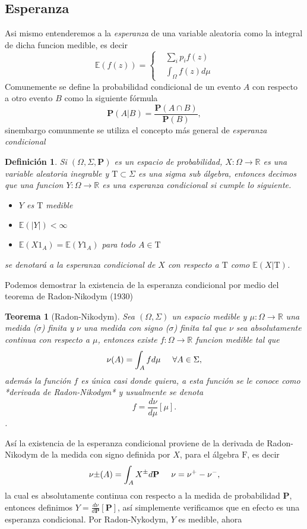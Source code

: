 \documentclass[letterpaper]{article}
\newtheorem{teorema}{Teorema}[section]
\newtheorem{def.}{Definici\'on}[section]
\newcommand{\prob}{\textbf{P}}
\newcommand{\esp}{\mathbb E}
\newcommand{\dem}{{\noindent \sc Demostraci\'on. }}
\newcommand{\re}{\ensuremath{\mathbb R }}
\begin{document}
\subsection{Esperanza}
\label{sec:org88a314c}
\noindent Asi mismo entenderemos a la \emph{esperanza} de una variable aleatoria como la integral de dicha funcion medible, es decir
\begin{equation}
    \esp(f(z))=
    \begin{cases}
        & \sum_{i} p_i f(z)\\
        & \int_{\Omega}f(z)d\mu
    \end{cases}
\end{equation}
Comunemente se define la probabilidad condicional de un evento \(A\) con respecto a otro evento \(B\) como la siguiente fórmula
\[
    \prob(A|B)=\frac{\prob(A\cap B)}{\prob(B)},
\]
\noindent sinembargo comunmente se utiliza el concepto más general de \emph{esperanza condicional}
\begin{def.}
    Si \((\Omega,\Sigma,\prob)\) es un espacio de probabilidad, \(X:\Omega\rightarrow\re\) es una variable aleatoria inegrable y \(\mathrm{T} \subset\Sigma\) es una sigma sub álgebra, entonces decimos que una funcion \(Y:\Omega\rightarrow\re\) es una \emph{esperanza} condicional si cumple lo siguiente.
\begin{itemize}
\item \(Y\) es \(\mathrm{T}\) medible
\item \(\esp(|Y|)<\infty\)
\item \(\esp(X 1_A)=\esp(Y1_A)\) para todo \(A\in\mathrm{T}\)
\end{itemize}
se denotará a la esperanza condicional de \(X\) con respecto a \(\mathrm{T}\) como \(\esp(X|\mathrm{T})\).
\end{def.}
\noindent\dem Podemos demostrar la existencia de la esperanza condicional por medio del teorema de Radon-Nikodym (1930)
\begin{teorema}[Radon-Nikodym]
    Sea $(\Omega,\Sigma)$ un espacio medible y $\mu:\Omega\rightarrow\re$ una medida ($\sigma$) finita y $\nu$ una medida con signo ($\sigma$) finita tal que $\nu$ sea absolutamente continua con respecto a $\mu$, entonces existe $f:\Omega\rightarrow\re$ funcion medible tal que
\begin{equation}
    \nu(A)=\int_{A} f d\mu \hspace{0.5cm}\forall A\in\Sigma,
\end{equation}
además la función $f$ es única casi donde quiera, a esta función se le conoce como *derivada de Radon-Nikodym* y usualmente se denota
\[
    f=\frac{d\nu}{d\mu}[\mu].
\].
\end{teorema}
\noindent Así la existencia de la esperanza condicional proviene de la derivada de Radon-Nikodym de la medida con signo definida por \(X\), para el álgebra \(\mathrm{F}\), es decir
\[
    \nu{\pm}(A)=\int_{A}X^{\pm}d\textbf{P}\hspace{0.5cm}\nu=\nu^{+}-\nu^{-},
\]
\noindent la cual es absolutamente continua con respecto a la medida de probabilidad \textbf{P}, entonces definimos \(Y=\frac{d\nu}{d\textbf{P}}[\textbf{P}]\), así simplemente verificamos que en efecto es una esperanza condicional. Por Radon-Nykodym, \(Y\) es medible, ahora
\end{document}
